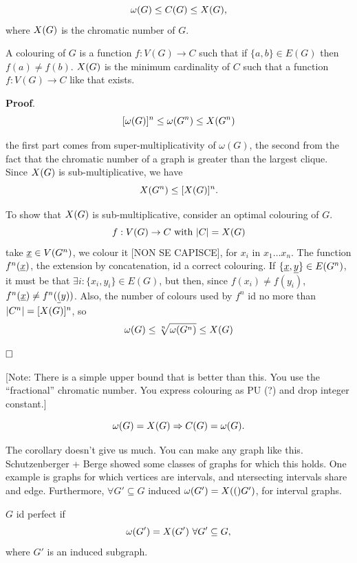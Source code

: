 \begin{prop}
 $$\omega(G) \leq C(G) \leq X(G),$$ where $X(G)$ is the chromatic number of $G$.
\end{prop}

A colouring of $G$ is a function $f: V(G) \rightarrow C$ such that if $\{a, b\} \in E(G)$ then $f(a) \not= f(b)$. $X(G)$ is the minimum cardinality of $C$ such that a function $f: V(G) \rightarrow C$ like that exists.

\noindent\textbf{Proof}. 
\[
 [\omega(G)]^n \leq \omega(G^n) \leq X(G^n)
\]

the first part comes from super-multiplicativity of $\omega(G)$, the second from the fact that the chromatic number of a graph is greater than the largest clique. Since $X(G)$ is sub-multiplicative, we have $$X(G^n) \leq [X(G)]^n.$$

To show that $X(G)$ is sub-multiplicative, consider an optimal colouring of $G$. $$f:V(G) \rightarrow C\ \text{with}\ |C| = X(G)$$ take $\underline{x} \in V(G^n)$, we colour it [NON SE CAPISCE], for $x_i$ in $x_1\ldots x_n$. The function $f^n(\underline{x})$, the extension by concatenation, id a correct colouring. If $\{\underline{x}, \underline{y}\} \in E(G^n)$, it must be that $\exists i : \{x_i, y_i\} \in E(G)$, but then, since $f(x_i) \not=f(y_i)$, $f^n(\underline{x}) \not= f^n(\underline{(}y))$. Also, the number of colours used by $f^n$ id no more than $|C^n| = [X(G)]^n$, so
\[
 \omega(G) \leq \sqrt[n]{\omega(G^n)} \leq X(G)
\]

$\hfill\Box$

[Note: There is a simple upper bound that is better than this. You use the ``fractional'' chromatic number. You express colouring as PU (?) and drop integer constant.]

\begin{cor}
 $$\omega(G) = X(G) \Rightarrow C(G) = \omega(G).$$
\end{cor}

The corollary doesn't give us much. You can make any graph like this. Schutzenberger + Berge showed some classes of graphs for which this holds. One example is graphs for which vertices are intervals, and ntersecting intervals share and edge. Furthermore, $\forall G' \subseteq G$ induced $\omega(G') = X(()G')$, for interval graphs.

\begin{definition}
 $G$ id perfect if $$\omega(G') = \chrom{G'}\ \forall G' \subseteq G,$$ where $G'$ is an induced subgraph.
\end{definition}

